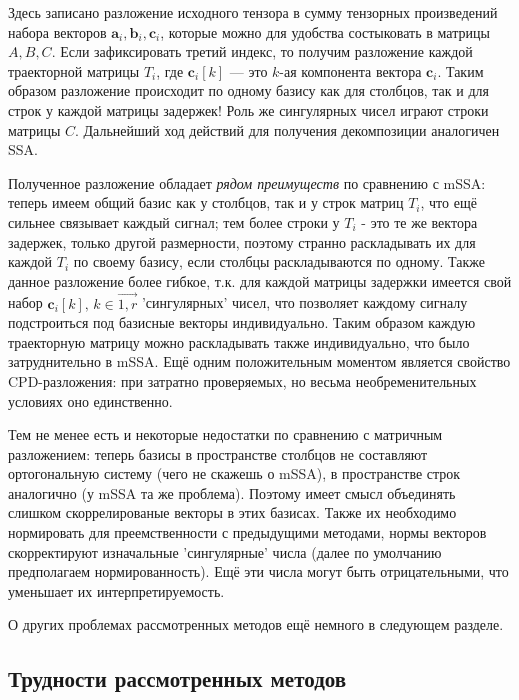 			 Здесь записано разложение исходного тензора в сумму тензорных произведений набора векторов $ \mathbf{a}_i, \mathbf{b}_i, \mathbf{c}_i $, которые можно для удобства состыковать в матрицы $ A, B, C $. Если зафиксировать третий индекс, то получим разложение каждой траекторной матрицы $ T_i $, где $ \mathbf{c}_i[k] $ --- это $ k $-ая компонента вектора $ \mathbf{c}_i $. Таким образом разложение происходит по одному базису как для столбцов, так и для строк у каждой матрицы задержек! Роль же сингулярных чисел играют строки матрицы $ C $. Дальнейший ход действий для получения декомпозиции аналогичен SSA.
			 
			 Полученное разложение обладает \textit{рядом преимуществ} по сравнению с mSSA: теперь имеем общий базис как у столбцов, так и у строк матриц $ T_i $, что ещё сильнее связывает каждый сигнал; тем более строки у $ T_i $ - это те же вектора задержек, только другой размерности, поэтому странно раскладывать их для каждой $ T_i $ по своему базису, если столбцы раскладываются по одному. Также данное разложение более гибкое, т.к. для каждой матрицы задержки имеется свой набор $ \mathbf{c}_i[k], \,  k \in \overrightarrow{1, r} $ 'сингулярных' чисел, что позволяет каждому сигналу подстроиться под базисные векторы индивидуально. Таким образом каждую траекторную матрицу можно раскладывать также индивидуально, что было затруднительно в mSSA. Ещё одним положительным моментом является свойство CPD-разложения: при затратно проверяемых, но весьма необременительных условиях оно единственно.
			 
			 
			 Тем не менее есть и некоторые недостатки по сравнению с матричным разложением: теперь базисы в пространстве столбцов не составляют ортогональную систему (чего не скажешь о mSSA), в пространстве строк аналогично (у mSSA та же проблема). Поэтому имеет смысл объединять слишком скоррелированые векторы в этих базисах. Также их необходимо нормировать для преемственности с предыдущими методами, нормы векторов скорректируют изначальные 'сингулярные' числа (далее по умолчанию предполагаем нормированность). Ещё эти числа могут быть отрицательными, что уменьшает их интерпретируемость.
			 
			 О других проблемах рассмотренных методов ещё немного в следующем разделе.
			 
			 
			 \subsection*{Трудности рассмотренных методов}
			 
